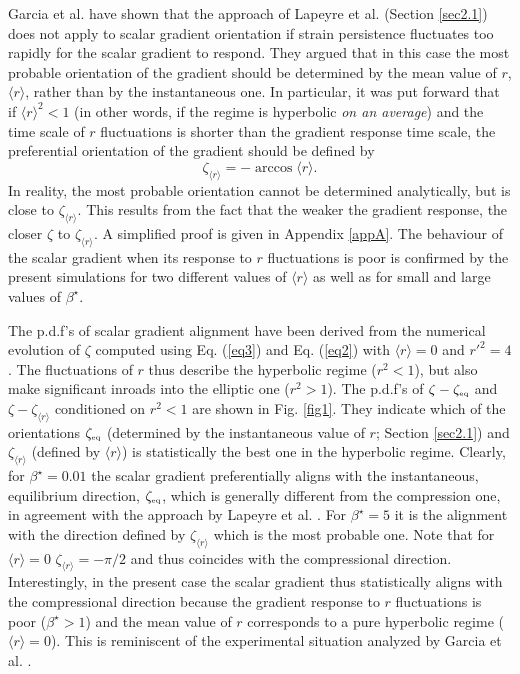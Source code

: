 \documentclass[doublespacing]{elsart}
\begin{document}
Garcia et al. \cite{Gal05} have shown that
the approach of
Lapeyre et al. \cite{Lal99} 
(Section \ref{sec2.1})
does not apply to scalar gradient orientation
if
strain persistence fluctuates too rapidly
for the scalar gradient to respond.
They argued that
in this case the most probable 
orientation of the gradient should be determined
by the mean value of $ r $, $ \langle r \rangle $, 
rather than by the instantaneous
one. In particular,
it was put forward that
if $ {\langle r \rangle}^2 < 1 $
(in other words, if the regime is hyperbolic
{\em on an average})
and the time scale of $ r $ fluctuations is shorter
than the gradient response time scale,
the preferential orientation of the gradient should be
defined by
\[
\zeta_{\langle r \rangle} = -\arccos\langle r \rangle.
\]
In reality, the most probable orientation cannot be determined
analytically, but is close to $ \zeta_{\langle r \rangle} $.
This results from the fact that the weaker the gradient response,
the closer $ \zeta $ to $ \zeta_{\langle r \rangle} $.
A simplified proof is given in Appendix \ref{appA}.
The behaviour of the scalar gradient when its response
to $ r $ fluctuations is poor 
is confirmed by the present simulations for  
two different values of $ \langle r \rangle $ 
as well as for small and large values of $ \beta^{\star} $.

The p.d.f's of scalar gradient alignment
have been
derived from the numerical evolution of $ \zeta $ computed 
using Eq. (\ref{eq3})  
and Eq. (\ref{eq2})
with 
$ \langle r \rangle = 0 $ and $ r'^2 = 4 $. 
The fluctuations of
$ r $ thus describe the hyperbolic regime
($ r^2 < 1 $), but also make significant inroads into the elliptic one
($ r^2 > 1 $).
The
p.d.f's of
$ \zeta - \zeta_{\mbox{\tiny eq}} $
and
$ \zeta - \zeta_{\langle r \rangle} $
conditioned on $ r^2 < 1 $ are shown in Fig. \ref{fig1}.
They indicate 
which of the
orientations
$ \zeta_{\mbox{\tiny eq}} $ 
(determined by the instantaneous value of $ r $;
Section \ref{sec2.1})
and
$ \zeta_{\langle r \rangle} $
(defined by $ \langle r \rangle $)
is statistically the best one
in the hyperbolic regime.
Clearly, 
for $ \beta^{\star} = 0.01 $ the scalar gradient 
preferentially
aligns with
the instantaneous, equilibrium direction, 
$ \zeta_{\mbox{\tiny eq}} $,
which is generally different from the compression one,
in agreement with the approach by Lapeyre et al. \cite{Lal99}.
For $ \beta^{\star} = 5 $ it is the alignment with the direction
defined by 
$ \zeta_{\langle r \rangle} $ which is the most probable
one.
Note that for $ \langle r \rangle = 0 $ 
$ \zeta_{\langle r \rangle} = - \pi/2 $
and thus
coincides with the compressional direction.
Interestingly,
in the present case
the scalar gradient thus statistically aligns 
with 
the compressional direction   
because the gradient
response to $ r $ fluctuations is poor ($ \beta^{\star} > 1 $)
and the mean value of $ r $ corresponds to a pure hyperbolic regime
($ \langle r \rangle = 0 $).
This is reminiscent of the experimental situation analyzed
by Garcia et al. \cite{Gal05}. 
\end{document}
